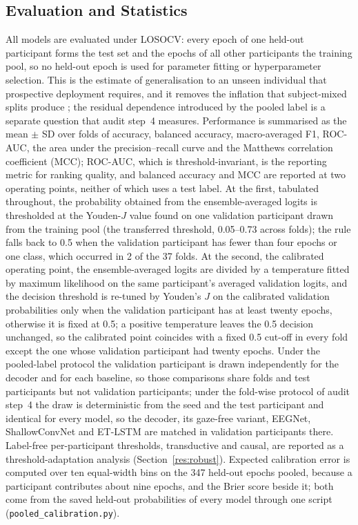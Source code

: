 \documentclass[pdflatex,sn-basic,Numbered,twocolumn,iicol]{sn-jnl}
\theoremstyle{thmstyleone}%
\theoremstyle{thmstyletwo}%
\theoremstyle{thmstylethree}%
\begin{document}
\subsection{Evaluation and Statistics}\label{sec:eval}

All models are evaluated under LOSOCV: every epoch of one held-out participant forms the test set and the epochs of all other participants the training pool, so no held-out epoch is used for parameter fitting or hyperparameter selection. This is the estimate of generalisation to an unseen individual that prospective deployment requires, and it removes the inflation that subject-mixed splits produce \cite{ref13,ref28,ref29,ref30,ref62}; the residual dependence introduced by the pooled label is a separate question that audit step~4 measures. Performance is summarised as the mean $\pm$ SD over folds of accuracy, balanced accuracy, macro-averaged F1, ROC-AUC, the area under the precision--recall curve and the Matthews correlation coefficient (MCC); ROC-AUC, which is threshold-invariant, is the reporting metric for ranking quality, and balanced accuracy and MCC are reported at two operating points, neither of which uses a test label. At the first, tabulated throughout, the probability obtained from the ensemble-averaged logits is thresholded at the Youden-$J$ value found on one validation participant drawn from the training pool (the transferred threshold, 0.05--0.73 across folds); the rule falls back to 0.5 when the validation participant has fewer than four epochs or one class, which occurred in 2 of the 37 folds. At the second, the calibrated operating point, the ensemble-averaged logits are divided by a temperature fitted by maximum likelihood on the same participant's averaged validation logits, and the decision threshold is re-tuned by Youden's $J$ on the calibrated validation probabilities only when the validation participant has at least twenty epochs, otherwise it is fixed at 0.5; a positive temperature leaves the 0.5 decision unchanged, so the calibrated point coincides with a fixed 0.5 cut-off in every fold except the one whose validation participant had twenty epochs. Under the pooled-label protocol the validation participant is drawn independently for the decoder and for each baseline, so those comparisons share folds and test participants but not validation participants; under the fold-wise protocol of audit step~4 the draw is deterministic from the seed and the test participant and identical for every model, so the decoder, its gaze-free variant, EEGNet, ShallowConvNet and ET-LSTM are matched in validation participants there. Label-free per-participant thresholds, transductive and causal, are reported as a threshold-adaptation analysis (Section~\ref{res:robust}). Expected calibration error is computed over ten equal-width bins on the 347 held-out epochs pooled, because a participant contributes about nine epochs, and the Brier score beside it; both come from the saved held-out probabilities of every model through one script (\texttt{pooled\_calibration.py}).
\end{document}

